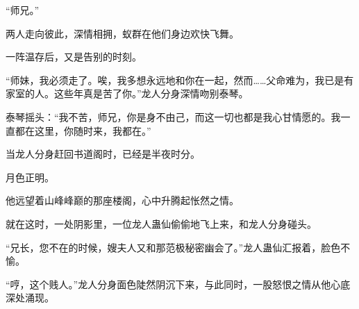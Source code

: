 \begin{this_body}
“师兄。”

两人走向彼此，深情相拥，蚁群在他们身边欢快飞舞。

一阵温存后，又是告别的时刻。

“师妹，我必须走了。唉，我多想永远地和你在一起，然而……父命难为，我已是有家室的人。这些年真是苦了你。”龙人分身深情吻别泰琴。

泰琴摇头：“我不苦，师兄，你是身不由己，而这一切也都是我心甘情愿的。我一直都在这里，你随时来，我都在。”

当龙人分身赶回书道阁时，已经是半夜时分。

月色正明。

他远望着山峰峰巅的那座楼阁，心中升腾起怅然之情。

就在这时，一处阴影里，一位龙人蛊仙偷偷地飞上来，和龙人分身碰头。

“兄长，您不在的时候，嫂夫人又和那范极秘密幽会了。”龙人蛊仙汇报着，脸色不愉。

“哼，这个贱人。”龙人分身面色陡然阴沉下来，与此同时，一股怒恨之情从他心底深处涌现。

\end{this_body}

